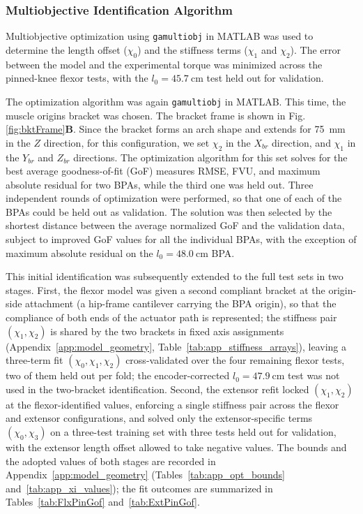 \subsubsection{Multiobjective Identification Algorithm}\label{sec:identification}

Multiobjective optimization using \texttt{gamultiobj} in MATLAB was used to determine the length offset ($\chi_{0}$) and the stiffness terms ($\chi_{1}$ and $\chi_{2}$). The error between the model and the experimental torque was minimized across the pinned-knee flexor tests, with the $l_{0}=\qty{45.7}{\cm}$ test held out for validation.

The optimization algorithm was again \texttt{gamultiobj} in MATLAB. This time, the muscle origins bracket was chosen. The bracket frame is shown in Fig. \ref{fig:bktFrame}\textbf{B}. Since the bracket forms an arch shape and extends for \qty{75}{\mm} in the $Z$ direction, for this configuration, we set $\chi_{2}$ in the $X_{br}$ direction, and $\chi_{1}$ in the $Y_{br}$ and $Z_{br}$ directions. The optimization algorithm for this set solves for the best average goodness-of-fit (GoF) measures RMSE, FVU, and maximum absolute residual for two BPAs, while the third one was held out. Three independent rounds of optimization were performed, so that one of each of the BPAs could be held out as validation. The solution was then selected by the shortest distance between the average normalized GoF and the validation data, subject to improved GoF values for all the individual BPAs, with the exception of maximum absolute residual on the $l_{0}=\qty{48.0}{\cm}$ BPA.

This initial identification was subsequently extended to the full test sets in two stages. First, the flexor model was given a second compliant bracket at the origin-side attachment (a hip-frame cantilever carrying the BPA origin), so that the compliance of both ends of the actuator path is represented; the stiffness pair $(\chi_{1}, \chi_{2})$ is shared by the two brackets in fixed axis assignments (Appendix~\ref{app:model_geometry}, Table~\ref{tab:app_stiffness_arrays}), leaving a three-term fit $(\chi_{0}, \chi_{1}, \chi_{2})$ cross-validated over the four remaining flexor tests, two of them held out per fold; the encoder-corrected $l_{0}=\qty{47.9}{\cm}$ test was not used in the two-bracket identification. Second, the extensor refit locked $(\chi_{1}, \chi_{2})$ at the flexor-identified values, enforcing a single stiffness pair across the flexor and extensor configurations, and solved only the extensor-specific terms $(\chi_{0}, \chi_{3})$ on a three-test training set with three tests held out for validation, with the extensor length offset allowed to take negative values. The bounds and the adopted values of both stages are recorded in Appendix~\ref{app:model_geometry} (Tables~\ref{tab:app_opt_bounds} and~\ref{tab:app_xi_values}); the fit outcomes are summarized in Tables~\ref{tab:FlxPinGof} and~\ref{tab:ExtPinGof}.

